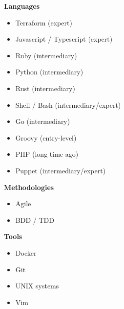 \documentclass[9pt]{developercv} %
\begin{document}


\begin{minipage}[t]{0.3\textwidth} %
  \vspace{-\baselineskip}

  \textbf{Languages}
  \begin{itemize}
      \item Terraform {\footnotesize (expert)}
      \item Javascript / Typescript {\footnotesize (expert)}
      \item Ruby {\footnotesize (intermediary)}
      \item Python {\footnotesize (intermediary)}
      \item Rust {\footnotesize (intermediary)}
      \item Shell / Bash {\footnotesize (intermediary/expert)}
      \item Go {\footnotesize (intermediary)}
      \item Groovy {\footnotesize (entry-level)}
      \item PHP {\footnotesize (long time ago)}
      \item Puppet {\footnotesize (intermediary/expert)}
  \end{itemize}
\end{minipage}
\hfill
\begin{minipage}[t]{0.3\textwidth}
  \vspace{-\baselineskip}

  \textbf{Methodologies}
  \begin{itemize}
      \item Agile
      \item BDD / TDD
  \end{itemize}

  \textbf{Tools}
  \begin{itemize}
      \item Docker
      \item Git
      \item UNIX systems
      \item Vim
  \end{itemize}
\end{minipage}
\hfill
\end{document}
